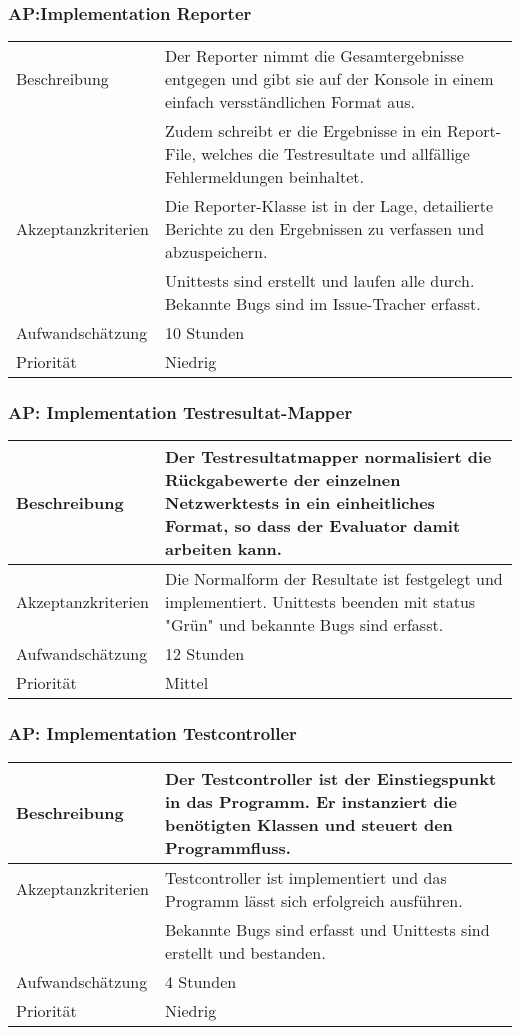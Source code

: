 \documentclass[
	ngerman,
	toc=listof, %
	toc=bibliography, %
	footnotes=multiple, %
	parskip=half, %
	numbers=noendperiod %
]{scrartcl}
\begin{document}
	\subsubsection{AP:Implementation Reporter}
	\begin{tabularx}{\textwidth}{lX}
		\toprule
		Beschreibung & Der Reporter nimmt die Gesamtergebnisse entgegen und gibt sie auf der Konsole in einem einfach versständlichen Format aus. \\
		& Zudem schreibt er die Ergebnisse in ein Report-File, welches die Testresultate und allfällige Fehlermeldungen beinhaltet. \\
		\midrule
		Akzeptanzkriterien & Die Reporter-Klasse ist in der Lage, detailierte Berichte zu den Ergebnissen zu verfassen und abzuspeichern.\\
		 & Unittests sind erstellt und laufen alle durch. Bekannte Bugs sind im Issue-Tracher erfasst.\\
		\midrule
		Aufwandschätzung & 10 Stunden\\
		\midrule
		Priorität & Niedrig \\
		\bottomrule
	\end{tabularx}

	\subsubsection{AP: Implementation Testresultat-Mapper}
	\begin{tabularx}{\textwidth}{lX}
		\toprule
		Beschreibung & Der Testresultatmapper normalisiert die Rückgabewerte der einzelnen Netzwerktests in ein einheitliches Format, so dass der Evaluator damit arbeiten kann.\\
		\midrule
		Akzeptanzkriterien & Die Normalform der Resultate ist festgelegt und implementiert. Unittests beenden mit status "Grün" und bekannte Bugs sind erfasst.\\
		\midrule
		Aufwandschätzung & 12 Stunden\\
		\midrule
		Priorität & Mittel \\
		\bottomrule
	\end{tabularx}

	\subsubsection{AP: Implementation Testcontroller}
	\begin{tabularx}{\textwidth}{lX}
		\toprule
		Beschreibung & Der Testcontroller ist der Einstiegspunkt in das Programm. Er instanziert die benötigten Klassen und steuert den Programmfluss.\\
		\midrule
		Akzeptanzkriterien & Testcontroller ist implementiert und das Programm lässt sich erfolgreich ausführen.\\
		 & Bekannte Bugs sind erfasst und Unittests sind erstellt und bestanden.\\
		\midrule
		Aufwandschätzung & 4 Stunden \\
		\midrule
		Priorität & Niedrig \\
		\bottomrule
	\end{tabularx}
	\newpage
\end{document}
